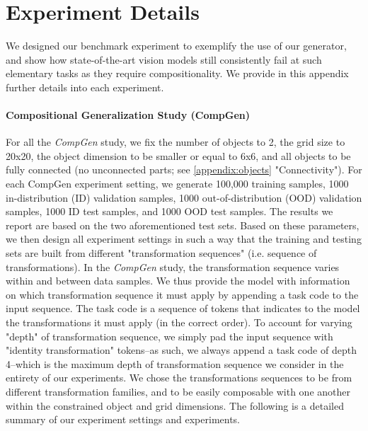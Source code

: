 \section{Experiment Details}\label{appendix:experiment_details}

We designed our benchmark experiment to exemplify the use of our generator, and show how state-of-the-art vision models still consistently fail at such elementary tasks as they require compositionality. We provide in this appendix further details into each experiment. 

\paragraph{Compositional Generalization Study (CompGen)} 

For all the \textit{CompGen} study, we fix the number of objects to 2, the grid size to 20x20, the object dimension to be smaller or equal to 6x6, and all objects to be fully connected (no unconnected parts; see \ref{appendix:objects} "Connectivity"). For each CompGen experiment setting, we generate 100,000 training samples, 1000 in-distribution (ID) validation samples, 1000 out-of-distribution (OOD) validation samples, 1000 ID test samples, and 1000 OOD test samples. The results we report are based on the two aforementioned test sets. Based on these parameters, we then design all experiment settings in such a way that the training and testing sets are built from different "transformation sequences" (i.e. sequence of transformations). In the \textit{CompGen} study, the transformation sequence varies within and between data samples. We thus provide the model with information on which transformation sequence it must apply by appending a task code to the input sequence. The task code is a sequence of tokens that indicates to the model the transformations it must apply (in the correct order). To account for varying "depth" of transformation sequence, we simply pad the input sequence with "identity transformation" tokens--as such, we always append a task code of depth 4--which is the maximum depth of transformation sequence we consider in the entirety of our experiments. We chose the transformations sequences to be from different transformation families, and to be easily composable with one another within the constrained object and grid dimensions. The following is a detailed summary of our experiment settings and experiments.  

